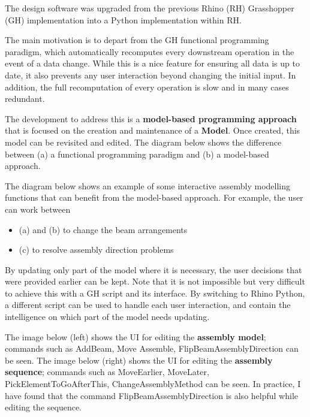 The design software was upgraded from the previous Rhino (RH) Grasshopper (GH) implementation  into a Python implementation within RH.

The main motivation is to depart from the GH functional programming paradigm, which automatically recomputes every downstream operation in the event of a data change. While this is a nice feature for ensuring all data is up to date, it also prevents any user interaction beyond changing the initial input. In addition, the full recomputation of every operation is slow and in many cases redundant.

The development to address this is a \textbf{model-based programming approach} that is focused on the creation and maintenance of a \textbf{Model}. Once created, this model can be revisited and edited. The diagram below shows the difference between (a) a functional programming paradigm and (b) a model-based approach.



The diagram below shows an example of some interactive assembly modelling functions that can benefit from the model-based approach. For example, the user can work between

\begin{itemize}
	\item (a) and (b) to change the beam arrangements

	\item (c) to resolve assembly direction problems

\end{itemize}
By updating only part of the model where it is necessary, the user decisions that were provided earlier can be kept. Note that it is not impossible but very difficult to achieve this with a GH script and its interface. By switching to Rhino Python, a different script can be used to handle each user interaction, and contain the intelligence on which part of the model needs updating.



The image below (left) shows the UI for editing the \textbf{assembly model}; commands such as AddBeam, Move Assemble, FlipBeamAssemblyDirection can be seen. The image below (right) shows the UI for editing the \textbf{assembly sequence}; commands such as MoveEarlier, MoveLater, PickElementToGoAfterThis, ChangeAssemblyMethod can be seen. In practice, I have found that the command FlipBeamAssemblyDirection is also helpful while editing the sequence.

